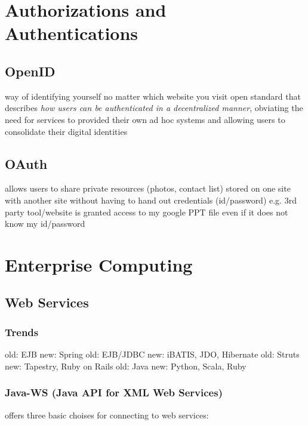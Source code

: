 \documentclass{myproc}
\begin{document}
\section{Authorizations and Authentications}
\subsection{OpenID}
\bit
\w way of identifying yourself no matter which website you visit
\w open standard that describes {\em how users can be authenticated in a
  decentralized manner}, obviating the need for services to provided their own
ad hoc systems and allowing users to consolidate their digital identities
\eit
\subsection{OAuth}
\bit
\w allows users to share private resources (photos, contact list)
stored on one site with another site without having to hand out credentials
(id/password)
\w e.g. 3rd party tool/website is granted access to my google PPT file even if
it does not know my id/password
\w {}
\eit

\section{Enterprise Computing}
\subsection{Web Services}
\subsubsection{Trends}
\bit
\w {}
  \bit
  \w old: EJB
  \w new: Spring
  \eit
\w {}
  \bit
  \w old: EJB/JDBC
  \w new: iBATIS, JDO, Hibernate
  \eit
\w {}
  \bit
  \w old: Struts
  \w new: Tapestry, Ruby on Rails
  \eit
\w {}
  \bit
  \w old: Java
  \w new: Python, Scala, Ruby
  \eit
\eit


\subsubsection{Java-WS (Java API for XML Web Services)}
\bit
\w offers three basic choises for connecting to web services: 
  \ben
  \w {}
  \w {}
  \w {}
  \een
\eit
\end{document}
